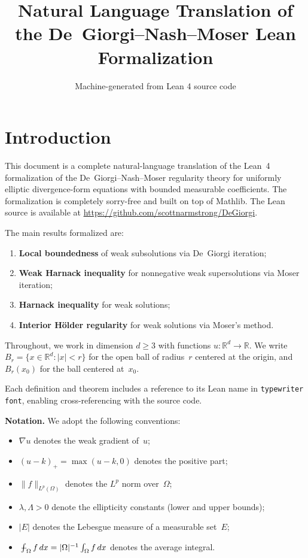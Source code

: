 \documentclass[11pt]{amsart}
\title{Natural Language Translation of the De~Giorgi--Nash--Moser Lean Formalization}
\author{Machine-generated from Lean 4 source code}
\date{}
\newcommand{\R}{\mathbb{R}}
\newcommand{\fint}{\mathop{\mathchoice%
  {\,\rlap{$\displaystyle-$}\!\int}%
  {\,\rlap{$\textstyle-$}\!\int}%
  {\,\rlap{$\scriptstyle-$}\!\int}%
  {\,\rlap{$\scriptscriptstyle-$}\!\int}}\nolimits}
\newcommand{\Lp}[1]{L^{#1}}
\newcommand{\Ball}[2]{B_{#1}(#2)}
\newcommand{\Bz}[1]{B_{#1}}
\theoremstyle{definition}
\theoremstyle{remark}
\begin{document}
\maketitle

\tableofcontents

\section{Introduction}\label{sec:intro}

This document is a complete natural-language translation of the Lean~4 formalization of the De~Giorgi--Nash--Moser regularity theory for uniformly elliptic divergence-form equations with bounded measurable coefficients. The formalization is completely sorry-free and built on top of Mathlib. The Lean source is available at \url{https://github.com/scottnarmstrong/DeGiorgi}.

The main results formalized are:
\begin{enumerate}[label=(\roman*)]
  \item \textbf{Local boundedness} of weak subsolutions via De~Giorgi iteration;
  \item \textbf{Weak Harnack inequality} for nonnegative weak supersolutions via Moser iteration;
  \item \textbf{Harnack inequality} for weak solutions;
  \item \textbf{Interior H\"older regularity} for weak solutions via Moser's method.
\end{enumerate}

Throughout, we work in dimension $d \ge 3$ with functions $u \colon \R^d \to \R$. We write $\Bz{r} = \{x \in \R^d : |x| < r\}$ for the open ball of radius~$r$ centered at the origin, and $\Ball{r}{x_0}$ for the ball centered at~$x_0$.

Each definition and theorem includes a reference to its Lean name in \texttt{typewriter font}, enabling cross-referencing with the source code.

\bigskip
\noindent\textbf{Notation.} We adopt the following conventions:
\begin{itemize}
  \item $\nabla u$ denotes the weak gradient of~$u$;
  \item $(u - k)_+ = \max(u - k, 0)$ denotes the positive part;
  \item $\|f\|_{\Lp{p}(\Omega)}$ denotes the $\Lp{p}$ norm over~$\Omega$;
  \item $\lambda, \Lambda > 0$ denote the ellipticity constants (lower and upper bounds);
  \item $|E|$ denotes the Lebesgue measure of a measurable set~$E$;
  \item $\fint_\Omega f\, dx = |\Omega|^{-1}\int_\Omega f\, dx$ denotes the average integral.
\end{itemize}
\end{document}

